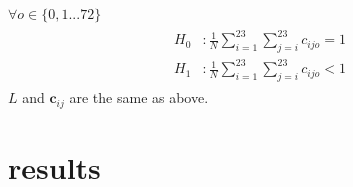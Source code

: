 \documentclass[a4,center,fleqn]{NAR}
\begin{document}
\begin{enumerate}
\begin{enumerate}
                    $\forall o \in \{0, 1 ... 72\}$
                \begin{align}
                    \begin{split}
                        H_0&: \frac{1}{N}\sum_{i=1}^{23}{\sum_{j=i}^{23}{c_{ijo}}} = 1 \\
                        H_1&: \frac{1}{N}\sum_{i=1}^{23}{\sum_{j=i}^{23}{c_{ijo}}} < 1
                    \end{split}
                    \label{eq:h2a}
                \end{align}
                        $L$ and $\mathbf{c}_{ij}$ are the same as above.

            \end{enumerate}
\end{enumerate}
\section{results}
\end{document}
